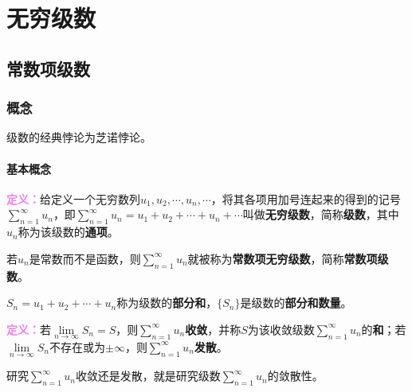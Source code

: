 \setcounter{tocdepth}{4}
\setcounter{secnumdepth}{4}
\renewcommand{\baselinestretch}{1.5}
\chapter{无穷级数}
\section{常数项级数}

\subsection{概念}

级数的经典悖论为芝诺悖论。

\subsubsection{基本概念}

\textcolor{violet}{\textbf{定义：}}给定义一个无穷数列$u_1,u_2,\cdots,u_n,\cdots$，将其各项用加号连起来的得到的记号$\sum\limits_{n=1}^\infty u_n$，即$\sum\limits_{n=1}^\infty u_n=u_1+u_2+\cdots+u_n+\cdots$叫做\textbf{无穷级数}，简称\textbf{级数}，其中$u_n$称为该级数的\textbf{通项}。

若$u_n$是常数而不是函数，则$\sum\limits_{n=1}^\infty u_n$就被称为\textbf{常数项无穷级数}，简称\textbf{常数项级数}。

$S_n=u_1+u_2+\cdots+u_n$称为级数的\textbf{部分和}，$\{S_n\}$是级数的\textbf{部分和数量}。

\textcolor{violet}{\textbf{定义：}}若$\lim\limits_{n\to\infty}S_n=S$，则$\sum\limits_{n=1}^\infty u_n$\textbf{收敛}，并称$S$为该收敛级数$\sum\limits_{n=1}^\infty u_n$的\textbf{和}；若$\lim\limits_{n\to\infty}S_n$不存在或为$\pm\infty$，则$\sum\limits_{n=1}^\infty u_n$\textbf{发散}。

研究$\sum\limits_{n=1}^\infty u_n$收敛还是发散，就是研究级数$\sum\limits_{n=1}^\infty u_n$的敛散性。

